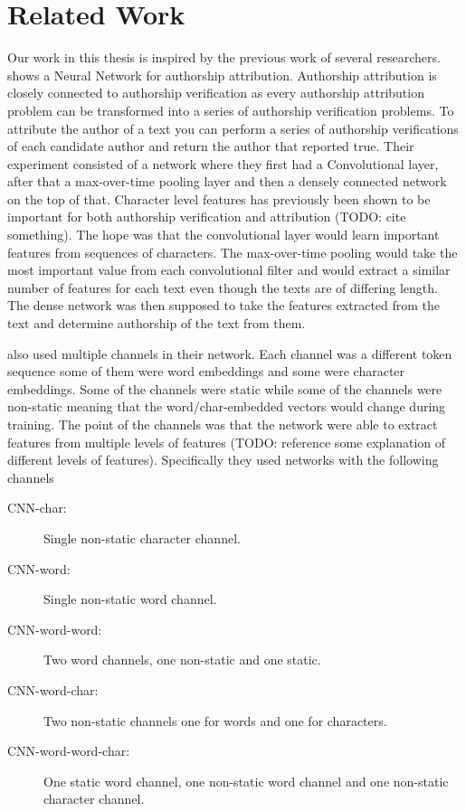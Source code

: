\section{Related Work} \label{sec:related_work}

Our work in this thesis is inspired by the previous work of several researchers.
\cite{DBLP:journals/corr/RuderGB16c} shows a Neural Network for authorship
attribution. Authorship attribution is closely connected to authorship
verification as every authorship attribution problem can be transformed into a
series of authorship verification problems. To attribute the author of a text
you can perform a series of authorship verifications of each candidate author
and return the author that reported true. Their experiment consisted of a
network where they first had a Convolutional layer, after that a max-over-time
pooling layer and then a densely connected network on the top of that. Character
level features has previously been shown to be important for both authorship
verification and attribution (TODO: cite something). The hope was that the
convolutional layer would learn important features from sequences of characters.
The max-over-time pooling would take the most important value from each
convolutional filter and would extract a similar number of features for each
text even though the texts are of differing length. The dense network was then
supposed to take the features extracted from the text and determine authorship
of the text from them.

\cite{DBLP:journals/corr/RuderGB16c} also used multiple channels in their
network. Each channel was a different token sequence some of them were word
embeddings and some were character embeddings. Some of the channels were static
while some of the channels were non-static meaning that the word/char-embedded
vectors would change during training. The point of the channels was that the
network were able to extract features from multiple levels of features (TODO:
reference some explanation of different levels of features). Specifically they
used networks with the following channels

\begin{description}
    \item[CNN-char:] Single non-static character channel.
    \item[CNN-word:] Single non-static word channel.
    \item[CNN-word-word:] Two word channels, one non-static and one static.
    \item[CNN-word-char:] Two non-static channels one for words and one for
        characters.
    \item[CNN-word-word-char:] One static word channel, one non-static word
        channel and one non-static character channel.
\end{description}

